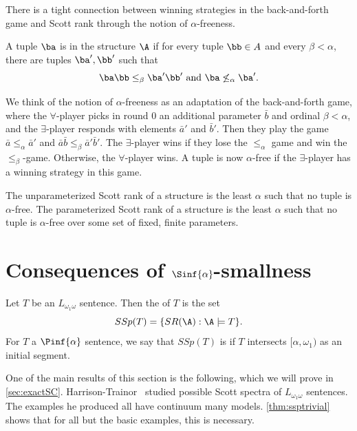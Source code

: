 \documentclass[10pt,a4paper]{amsart}
\renewcommand{\-}{\text{-}}
\begin{document}
There is a tight connection between winning strategies in the back-and-forth game and Scott rank through the notion of $\alpha$-freeness.

\begin{definition}
A tuple $\ba$ is  in the structure $\A$ if for every tuple $\bb\in A$ and every $\beta<\alpha$, there are tuples $\ba',\bb'$ such that 
\[\ba\bb\leq_\beta\ba'\bb' \text{ and } \ba\not\leq_\alpha\ba'.\]
\end{definition}

We think of the notion of $\alpha$-freeness as an adaptation of the back-and-forth game, where the $\forall$-player picks in round $0$ an additional parameter $\bar b$ and ordinal $\beta<\alpha$, and the $\exists$-player responds with elements $\bar a'$ and $\bar b'$. Then they play the game $\bar a\leq_\alpha \bar a'$ and $\bar a \bar b\leq_\beta \bar a'\bar b'$. The $\exists$-player wins if they lose the $\leq_\alpha$ game and win the $\leq_\beta$-game. Otherwise, the $\forall$-player wins. A tuple is now $\alpha$-free if the $\exists$-player has a winning strategy in this game.
\begin{theorem}
The unparameterized Scott rank of a structure is the least $\alpha$ such that no tuple is $\alpha$-free.
The parameterized Scott rank of a structure is the least $\alpha$ such that no tuple is $\alpha$-free over some set of fixed, finite parameters.
\end{theorem}


 

\section{Consequences of $\Sinf{\alpha}$-smallness}

\begin{definition}\label{def:scottspectrum}
	Let $T$ be an $L_{\omega_1\omega}$ sentence. Then the  of $T$ is the set
	\[ SSp(T)=\{ SR(\A): \A\models T\}.\]
	For $T$ a $\Pinf{\alpha}$ sentence, we say that $SSp(T)$ is  if $T$ intersects $[\alpha,\omega_1)$ as an initial segment.
\end{definition}
One of the main results of this section is the following, which we will prove in \cref{sec:exactSC}.
\ssptrivial
Harrison-Trainor~\cite{HT18} studied possible Scott spectra of $L_{\omega_1\omega}$ sentences. The examples he produced all have continuum many models. \cref{thm:ssptrivial} shows that for all but the basic examples, this is necessary.
\end{document}
